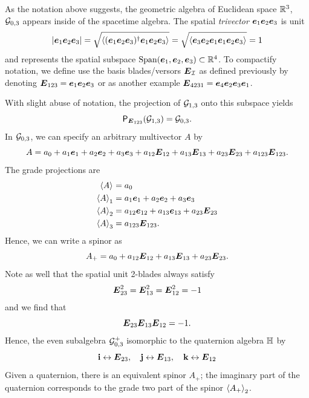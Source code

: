 \documentclass{article}
\begin{document}
As the notation above suggests, the geometric algebra of Euclidean space $\R^3$, $\G_{0,3}$ appears inside of the spacetime algebra. The spatial \emph{trivector} $\blade{e}_1 \blade{e}_2 \blade{e}_3$ is unit
\begin{equation}
|\blade{e}_1 \blade{e}_2 \blade{e}_3| = \sqrt{\proj{}{(\blade{e}_1 \blade{e}_2 \blade{e}_3)^\dagger \blade{e}_1 \blade{e}_2 \blade{e}_3}} = \sqrt{\proj{}{\blade{e}_3 \blade{e}_2 \blade{e}_1 \blade{e}_1 \blade{e}_2 \blade{e}_3}}=1
\end{equation}
and represents the spatial subspace $\mathrm{Span}(\blade{e}_1, \blade{e}_2, \blade{e}_3) \subset \R^4$. To compactify notation, we define use the basis blades/versors $\blade{E}_{\mathcal{I}}$ as defined previously by denoting $\blade{E}_{123}=\blade{e}_1\blade{e}_2\blade{e}_3$ or as another example $\blade{E}_{4231}=\blade{e}_4\blade{e}_2\blade{e}_3\blade{e}_1$. 

With slight abuse of notation, the projection of $\G_{1,3}$ onto this subspace yields
\begin{equation}
\projection_{\blade{E}_{123}}(\G_{1,3}) = \G_{0,3}.
\end{equation}
In $\G_{0,3}$, we can specify an arbitrary multivector $A$ by
\begin{equation}
A= a_0 + a_1 \blade{e}_1 + a_2 \blade{e}_2 + a_3 \blade{e}_3 + a_{12} \blade{E}_{12} + a_{13} \blade{E}_{13} + a_{23} \blade{E}_{23} + a_{123} \blade{E}_{123}.
\end{equation}
The grade projections are
\begin{subequations}
\begin{align}
\proj{}{A}&=a_0\\
\proj{1}{A}&=a_1 \blade{e}_1 + a_2 \blade{e}_2 + a_3 \blade{e}_3\\
\proj{2}{A}&=a_{12} \blade{e}_{12} + a_{13} \blade{e}_{13} + a_{23} \blade{E}_{23}\\
\proj{3}{A}&= a_{123} \blade{E}_{123}.
\end{align}
\end{subequations}
Hence, we can write a spinor as
\begin{equation}
A_+ = a_0 + a_{12} \blade{E}_{12} + a_{13} \blade{E}_{13} + a_{23}\blade{E}_{23}.
\end{equation}
Note as well that the spatial unit 2-blades always satisfy
\begin{align}
\blade{E}_{23}^2 = \blade{E}_{13}^2 = \blade{E}_{12}^2 = -1
\end{align}
and we find that
\begin{equation}
\blade{E}_{23}\blade{E}_{13}\blade{E}_{12} = -1.
\end{equation}
Hence, the even subalgebra $\G_{0,3}^+$ isomorphic to the quaternion algebra $\quat$ by
\begin{equation}
\mathbf{i} \leftrightarrow \blade{E}_{23}, \quad \mathbf{j} \leftrightarrow \blade{E}_{13}, \quad \mathbf{k} \leftrightarrow \blade{E}_{12}
\end{equation}
Given a quaternion, there is an equivalent spinor $A_+$; the imaginary part of the quaternion corresponds to the grade two part of the spinor $\proj{2}{A_+}$.
\end{document}
